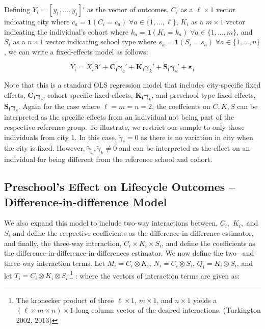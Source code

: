 \documentclass[11pt]{article}
\begin{document}
Defining $Y_i = [y_1, \dots , y_j]'$ as the vector of outcomes, $C_i$ as a $\ell \times 1$ vector indicating city where $c_{a} = \mathbf{1}(C_i = c_a)\; \forall a \in \{1, \dots, {\ell} \}$, $K_i$ as a $m \times 1$ vector indicating the individual's cohort where $k_a = \mathbf{1}(K_i = k_a)\; \forall a \in \{1, \dots, m\}$, and  $S_i$ as a $n \times 1$ vector indicating school type where $s_a = \mathbf{1}(S_i = s_a)\; \forall a \in \{1, \dots, n \}$, we can write a fixed-effects model as follows:


\begin{equation} \label{eq:fixed}
Y_i = X_i \boldsymbol{\beta}' + \boldsymbol{C_i} \boldsymbol{\gamma}_c' + \boldsymbol{K_i} \boldsymbol{\gamma}_k' + \boldsymbol{S_i} \boldsymbol{\gamma}_s'  + \boldsymbol{\varepsilon}_{i}
\end{equation}

Note that this is a standard OLS regression model that includes city-specific fixed effects, $ \boldsymbol{C_i \gamma}_c$, cohort-specific fixed effects,  $ \boldsymbol{K_i \gamma}_k$, and preschool-type fixed effects, $ \boldsymbol{S_i \gamma}_s$. Again for the case where $\ell = m = n = 2$, the coeffcients on $C, K, S$ can be interpreted as the specific effects from an individual not being part of the respective reference group. To illustrate, we restrict our sample to only those individuals from city 1. In this case,  $\tilde{\gamma}_c = 0$	 as there is no variation in city when the city is fixed. However, $ \tilde{\gamma}_s, \tilde{\gamma}_k \neq 0$ and can be interpreted as the effect on an individual for being different from the reference school and cohort. 

\subsection{Preschool's Effect on Lifecycle Outcomes -- Difference-in-difference Model}

We also expand this model to include two-way interactions between, $C_i,$ $K_i,$ and $S_i$ and define the respective coefficients as the difference-in-difference estimator, and finally, the three-way interaction, $C_i \times K_i \times S_i$, and define the coefficients as the difference-in-difference-in-differences estimator.  We now define the two-- and three-way interaction terms. Let $M_i = C_i \otimes K_i$,  $N_i = C_i \otimes S_i$, $Q_i = K_i \otimes S_i$, and let $T_i = C_i \otimes K_i \otimes S_i$:\footnote{The kronecker product of three $\ell \times 1$, $m \times 1$, and $n \times 1$ yields a $(\ell \times m \times n) \times 1$ long column vector of the desired interactions. (Turkington 2002, 2013)}  : where the vectors of interaction terms are given as:
\end{document}
